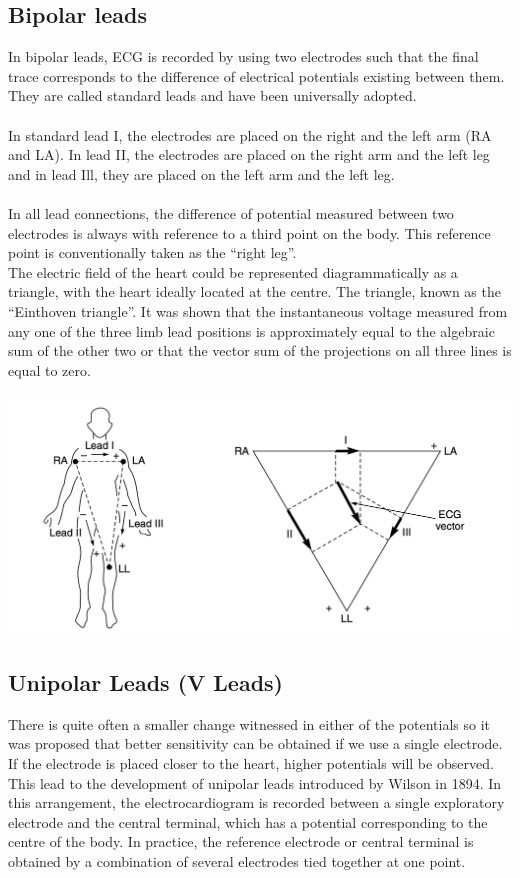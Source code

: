 \documentclass{article}
\begin{document}
\subsection{Bipolar leads}
In bipolar leads, ECG is recorded by using two electrodes such that the final trace corresponds to the difference of electrical potentials existing between them. They are called standard leads and have been universally adopted.\\
\\
In standard lead I, the electrodes are placed on the right and the left arm (RA and LA). In lead II, the electrodes are placed on the right arm and the left leg and in lead Ill, they are placed on the left arm and the left leg.\\
\\
In all lead connections, the difference of potential measured between two electrodes is always with reference to a third point on the body. This reference point is conventionally taken as the “right leg”.\\
The electric field of the heart could be represented diagrammatically as a triangle, with the heart ideally located at the centre. The triangle, known as the “Einthoven triangle”. It was shown that the instantaneous voltage measured from any one of the three limb lead positions is approximately equal to the algebraic sum of the other two or that the vector sum of the projections on all three lines is equal to zero.
\begin{center}
    \includegraphics[scale=0.4]{Screenshot 2023-05-03 at 1.11.19 AM.png}
\end{center}
\subsection{Unipolar Leads (V Leads)}
There is quite often a smaller change witnessed in either of the potentials so it was proposed that better sensitivity can be obtained if we use a single electrode. If the electrode is placed closer to the heart, higher potentials will be observed. This lead to the development of unipolar leads introduced by Wilson in 1894. In this arrangement, the electrocardiogram is recorded between a single exploratory electrode and the central terminal, which has a potential corresponding to the centre of the body. In practice, the reference electrode or central terminal is obtained by a combination of several electrodes tied together at one point. 
\end{document}
